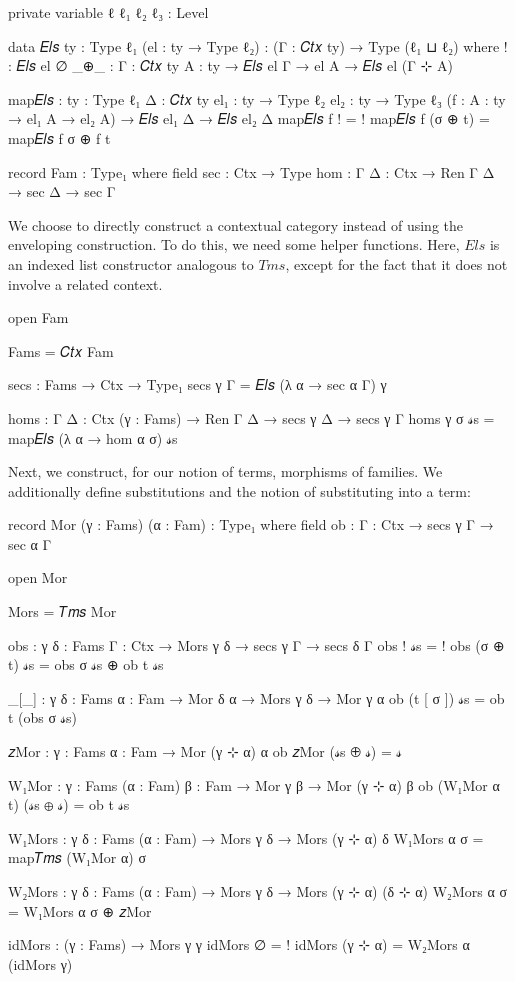 \begin{code}[hide]

private
  variable
    ℓ ℓ₁ ℓ₂ ℓ₃ : Level

data 𝐸𝑙𝑠 {ty : Type ℓ₁} (el : ty → Type ℓ₂) : (Γ : 𝐶𝑡𝑥 ty) → Type (ℓ₁ ⊔ ℓ₂) where
  ! : 𝐸𝑙𝑠 el ∅
  _⊕_ : {Γ : 𝐶𝑡𝑥 ty} {A : ty} → 𝐸𝑙𝑠 el Γ → el A → 𝐸𝑙𝑠 el (Γ ⊹ A)

map𝐸𝑙𝑠 : {ty : Type ℓ₁} {Δ : 𝐶𝑡𝑥 ty} {el₁ : ty → Type ℓ₂} {el₂ : ty → Type ℓ₃}
  (f : {A : ty} → el₁ A → el₂ A) → 𝐸𝑙𝑠 el₁ Δ → 𝐸𝑙𝑠 el₂ Δ
map𝐸𝑙𝑠 f ! = !
map𝐸𝑙𝑠 f (σ ⊕ t) = map𝐸𝑙𝑠 f σ ⊕ f t
\end{code}
\begin{code}
record Fam : Type₁ where
  field
    sec : Ctx → Type
    hom : {Γ Δ : Ctx} → Ren Γ Δ → sec Δ → sec Γ
\end{code}
We choose to directly construct a contextual category instead of using the
enveloping construction. To do this, we need some helper functions. Here,
$\mathit{Els}$ is an indexed list constructor analogous to $\mathit{Tms}$,
except for the fact that it does not involve a related context.
\begin{code}
open Fam

Fams = 𝐶𝑡𝑥 Fam

secs : Fams → Ctx → Type₁
secs γ Γ = 𝐸𝑙𝑠 (λ α → sec α Γ) γ

homs : {Γ Δ : Ctx} (γ : Fams) → Ren Γ Δ → secs γ Δ → secs γ Γ
homs γ σ 𝓈s = map𝐸𝑙𝑠 (λ {α} → hom α σ) 𝓈s
\end{code}
Next, we construct, for our notion of terms, morphisms of families. We
additionally define substitutions and the notion of substituting into a term:
\begin{code}
record Mor (γ : Fams) (α : Fam) : Type₁ where
  field
    ob : {Γ : Ctx} → secs γ Γ → sec α Γ

open Mor

Mors = 𝑇𝑚𝑠 Mor

obs : {γ δ : Fams} {Γ : Ctx} → Mors γ δ → secs γ Γ → secs δ Γ
obs ! 𝓈s = !
obs (σ ⊕ t) 𝓈s = obs σ 𝓈s ⊕ ob t 𝓈s

_[_] : {γ δ : Fams} {α : Fam} → Mor δ α → Mors γ δ → Mor γ α
ob (t [ σ ]) 𝓈s = ob t (obs σ 𝓈s)
\end{code}
\begin{code}[hide]
𝑧Mor : {γ : Fams} {α : Fam} → Mor (γ ⊹ α) α
ob 𝑧Mor (𝓈s ⊕ 𝓈) = 𝓈

W₁Mor : {γ : Fams} (α : Fam) {β : Fam} → Mor γ β → Mor (γ ⊹ α) β
ob (W₁Mor α t) (𝓈s ⊕ 𝓈) = ob t 𝓈s

W₁Mors : {γ δ : Fams} (α : Fam) → Mors γ δ → Mors (γ ⊹ α) δ
W₁Mors α σ = map𝑇𝑚𝑠 (W₁Mor α) σ

W₂Mors : {γ δ : Fams} (α : Fam) → Mors γ δ → Mors (γ ⊹ α) (δ ⊹ α)
W₂Mors α σ = W₁Mors α σ ⊕ 𝑧Mor

idMors : (γ : Fams) → Mors γ γ
idMors ∅ = !
idMors (γ ⊹ α) = W₂Mors α (idMors γ)
\end{code}
